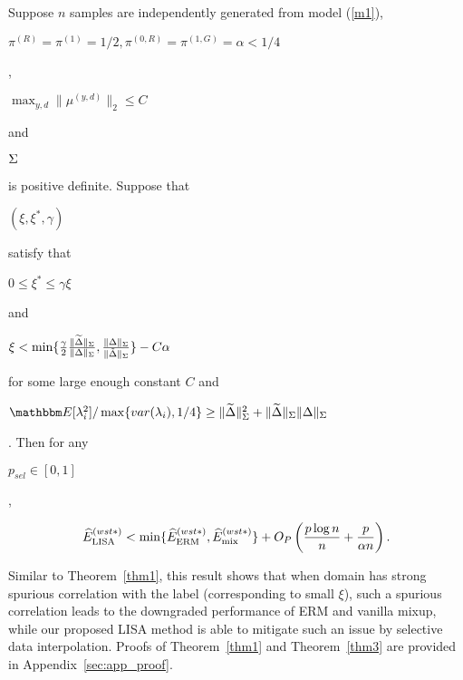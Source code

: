 \begin{theorem}
\label{thm3}
Suppose $n$ samples are independently generated from model (\ref{m1}), \begin{small}$\pi^{(R)}=\pi^{(1)}=1/2,\pi^{(0,R)}=\pi^{(1,G)}=\alpha<1/4$\end{small},  \begin{small}$\max_{y,d}\|\mu^{(y,d)}\|_2\leq C$\end{small} and \begin{small}$\Sigma$\end{small} is positive definite.
Suppose that \begin{small}$(\xi,\xi^*,\gamma)$\end{small} satisfy that \begin{small}$0\leq \xi^*\leq \gamma\xi$\end{small} and \begin{small}$\xi < \min\{\frac{\gamma}{2}\frac{\|\widetilde{\Delta}\|_{\Sigma}}{\|\Delta\|_{\Sigma}},\frac{\|\Delta\|_{\Sigma}}{\|\tilde{\Delta}\|_{\Sigma}}\}-C\alpha$\end{small}
 for some large enough constant $C$ and \begin{small}$\E[\lam_i^2]/\max\{var(\lam_i),1/4\}\geq \|\widetilde{\Delta}\|_{\Sig}^2+\|\widetilde{\Delta}\|_{\Sig}\|\Delta\|_{\Sig}$\end{small}.
Then for any \begin{small}$p_{sel}\in[0,1]$\end{small},
\begin{small}$$\widehat{E}_{\textup{LISA}}^{(wst*)}< \min\{\widehat{E}_{\textup{ERM}}^{(wst*)},\widehat{E}_{\textup{mix}}^{(wst*)}\}+O_P\left(\frac{p\log n}{n}+\frac{p}{\alpha n}\right).$$
\end{small}
\end{theorem}

Similar to Theorem~\ref{thm1}, this result shows that when domain has strong spurious correlation with the label (corresponding to small $\xi$), such a spurious correlation leads to the downgraded performance of ERM and vanilla mixup, while our proposed LISA method is able to mitigate such an issue by selective data interpolation. Proofs of Theorem~\ref{thm1} and Theorem~\ref{thm3} are provided in Appendix~\ref{sec:app_proof}.